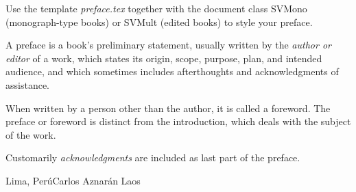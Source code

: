 %
%

\preface

Use the template \emph{preface.tex} together with the document class SVMono (monograph-type books) or SVMult (edited books) to style your preface.

A preface is a book's preliminary statement, usually written by the \textit{author or editor} of a work, which states its origin, scope, purpose, plan, and intended audience, and which sometimes includes afterthoughts and acknowledgments of assistance.

When written by a person other than the author, it is called a foreword. The preface or foreword is distinct from the introduction, which deals with the subject of the work.

Customarily \textit{acknowledgments} are included as last part of the preface.


\vspace{\baselineskip}
\begin{flushright}\noindent
    Lima, Perú\hfill Carlos Aznarán Laos
\end{flushright}


